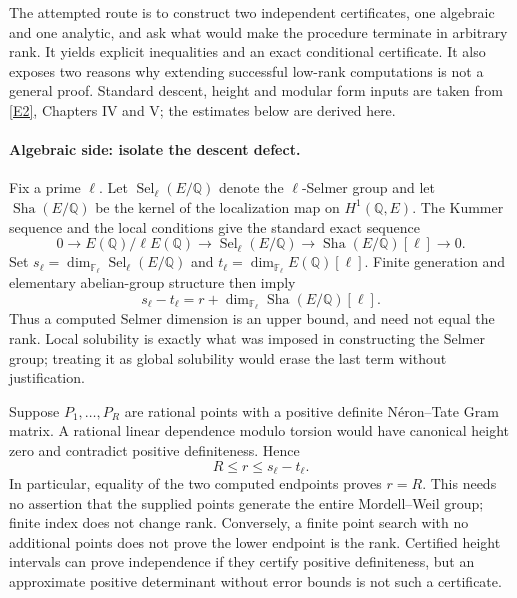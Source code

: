 \documentclass[11pt]{article}
\begin{document}
The attempted route is to construct two independent certificates, one
algebraic and one analytic, and ask what would make the procedure terminate
in arbitrary rank. It yields explicit inequalities and an exact conditional
certificate. It also exposes two reasons why extending successful low-rank
computations is not a general proof. Standard descent, height and modular
form inputs are taken from \href{https://www.jmilne.org/math/Books/ectext6.pdf}{[E2]}, Chapters IV and V; the estimates below are
derived here.

\paragraph{Algebraic side: isolate the descent defect.}
Fix a prime $\ell$. Let $\operatorname{Sel}_\ell(E/\mathbb Q)$ denote the
$\ell$-Selmer group and let $\operatorname{Sha}(E/\mathbb Q)$ be the kernel of the
localization map on $H^1(\mathbb Q,E)$. The Kummer sequence and the local
conditions give the standard exact sequence
\begin{equation}\label{cont6:kummer}
 0\longrightarrow E(\mathbb Q)/\ell E(\mathbb Q)
 \longrightarrow\operatorname{Sel}_\ell(E/\mathbb Q)
 \longrightarrow\operatorname{Sha}(E/\mathbb Q)[\ell]\longrightarrow0.
\end{equation}
Set $s_\ell=\dim_{\mathbb F_\ell}\operatorname{Sel}_\ell(E/\mathbb Q)$
and $t_\ell=\dim_{\mathbb F_\ell}E(\mathbb Q)[\ell]$. Finite generation
and elementary abelian-group structure then imply
\begin{equation}\label{cont6:rankdefect}
 s_\ell-t_\ell
 =r+\dim_{\mathbb F_\ell}\operatorname{Sha}(E/\mathbb Q)[\ell].
\end{equation}
Thus a computed Selmer dimension is an upper bound, and need not equal
the rank. Local solubility is exactly what was imposed in constructing
the Selmer group; treating it as global solubility would erase the last
term without justification.

Suppose $P_1,\ldots,P_R$ are rational points with a positive definite
N\'eron--Tate Gram matrix. A rational linear dependence modulo torsion
would have canonical height zero and contradict positive definiteness.
Hence
\begin{equation}\label{cont6:sandwich}
 R\le r\le s_\ell-t_\ell.
\end{equation}
In particular, equality of the two computed endpoints proves $r=R$.
This needs no assertion that the supplied points generate the entire
Mordell--Weil group; finite index does not change rank. Conversely, a
finite point search with no additional points does not prove the lower
endpoint is the rank. Certified height intervals can prove independence
if they certify positive definiteness, but an approximate positive
determinant without error bounds is not such a certificate.
\end{document}
